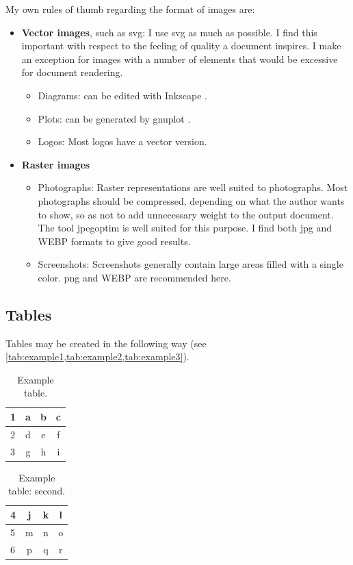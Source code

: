 My own rules of thumb regarding the format of images are:
\begin{itemize}
\item \textbf{Vector images}, such as \gls{svg}: I use \gls{svg} as much
as possible. I find this important with respect to the feeling of quality
a document inspires. I make an exception for images with a number of elements
that would be excessive for document rendering.
\begin{itemize}
\item Diagrams: can be edited with Inkscape \cite{inkscape}.
\item Plots: can be generated by gnuplot \cite{gnuplot}.
\item Logos: Most logos have a vector version.
\end{itemize}
\item \textbf{Raster images}
\begin{itemize}
\item Photographs: Raster representations are well suited to photographs.
      Most photographs should be compressed, depending on what the author
      wants to show, so as not to add unnecessary weight to the output document.
      The tool jpegoptim \cite{tjko/jpegoptim} is well suited for this purpose.
      I find both \gls{jpg} and WEBP formats to give good results.
\item Screenshots: Screenshots generally contain large areas filled with a
      single color. \gls{png} and WEBP are recommended here.
\end{itemize}
\end{itemize}

\subsection{Tables}
Tables may be created in the following way (see
\cref{tab:example1,tab:example2,tab:example3}).

\begin{table} \caption{\label{tab:example1} Example table.}
\begin{tabular}{l | c c c} \hline
1 & a & b & c \\ \hline
2 & d & e & f \\ \hline
3 & g & h & i \\
\hline \end{tabular}
\end{table}

\begin{table} \caption{\label{tab:example2} Example table: second.}
\begin{tabular}{l | c c c} \hline
4 & j & k & l \\ \hline
5 & m & n & o \\ \hline
6 & p & q & r \\
\hline \end{tabular}
\end{table}

